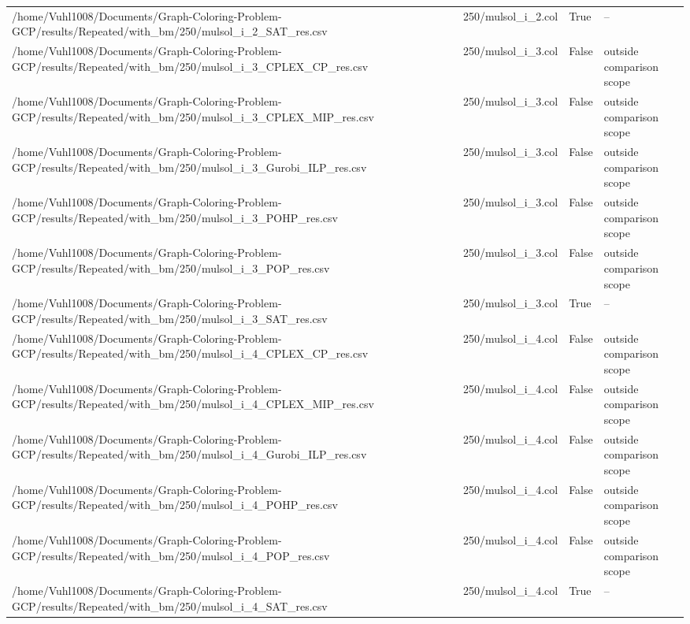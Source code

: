 \begin{table}[htbp]
\begin{tabular}{llll}
/home/Vuhl1008/Documents/Graph-Coloring-Problem-GCP/results/Repeated/with\_bm/250/mulsol\_i\_2\_SAT\_res.csv & 250/mulsol\_i\_2.col & True & -- \\
/home/Vuhl1008/Documents/Graph-Coloring-Problem-GCP/results/Repeated/with\_bm/250/mulsol\_i\_3\_CPLEX\_CP\_res.csv & 250/mulsol\_i\_3.col & False & outside comparison scope \\
/home/Vuhl1008/Documents/Graph-Coloring-Problem-GCP/results/Repeated/with\_bm/250/mulsol\_i\_3\_CPLEX\_MIP\_res.csv & 250/mulsol\_i\_3.col & False & outside comparison scope \\
/home/Vuhl1008/Documents/Graph-Coloring-Problem-GCP/results/Repeated/with\_bm/250/mulsol\_i\_3\_Gurobi\_ILP\_res.csv & 250/mulsol\_i\_3.col & False & outside comparison scope \\
/home/Vuhl1008/Documents/Graph-Coloring-Problem-GCP/results/Repeated/with\_bm/250/mulsol\_i\_3\_POHP\_res.csv & 250/mulsol\_i\_3.col & False & outside comparison scope \\
/home/Vuhl1008/Documents/Graph-Coloring-Problem-GCP/results/Repeated/with\_bm/250/mulsol\_i\_3\_POP\_res.csv & 250/mulsol\_i\_3.col & False & outside comparison scope \\
/home/Vuhl1008/Documents/Graph-Coloring-Problem-GCP/results/Repeated/with\_bm/250/mulsol\_i\_3\_SAT\_res.csv & 250/mulsol\_i\_3.col & True & -- \\
/home/Vuhl1008/Documents/Graph-Coloring-Problem-GCP/results/Repeated/with\_bm/250/mulsol\_i\_4\_CPLEX\_CP\_res.csv & 250/mulsol\_i\_4.col & False & outside comparison scope \\
/home/Vuhl1008/Documents/Graph-Coloring-Problem-GCP/results/Repeated/with\_bm/250/mulsol\_i\_4\_CPLEX\_MIP\_res.csv & 250/mulsol\_i\_4.col & False & outside comparison scope \\
/home/Vuhl1008/Documents/Graph-Coloring-Problem-GCP/results/Repeated/with\_bm/250/mulsol\_i\_4\_Gurobi\_ILP\_res.csv & 250/mulsol\_i\_4.col & False & outside comparison scope \\
/home/Vuhl1008/Documents/Graph-Coloring-Problem-GCP/results/Repeated/with\_bm/250/mulsol\_i\_4\_POHP\_res.csv & 250/mulsol\_i\_4.col & False & outside comparison scope \\
/home/Vuhl1008/Documents/Graph-Coloring-Problem-GCP/results/Repeated/with\_bm/250/mulsol\_i\_4\_POP\_res.csv & 250/mulsol\_i\_4.col & False & outside comparison scope \\
/home/Vuhl1008/Documents/Graph-Coloring-Problem-GCP/results/Repeated/with\_bm/250/mulsol\_i\_4\_SAT\_res.csv & 250/mulsol\_i\_4.col & True & -- \\

\end{tabular}
\end{table}
